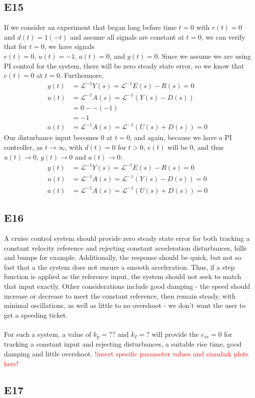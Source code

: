 \documentclass[11pt,titlepage]{article}
\begin{document}
	\subsection*{E15}
		If we consider an experiment that began long before time $t=0$ with $r(t)=0$ and $d(t)=1(-t)$ and assume all signals are constant at $t=0$, we can verify that for $t=0$, we have signals\\
		$e(t)=0$, $u(t)=-1$, $a(t)=0$, and $y(t)=0$.
	Since we assume we are using PI control for the system, there will be zero steady state error, so we know that $e(t)=0$ at $t=0$. Furthermore, 
	\begin{align*}
		y(t)&=\mathcal{L}^{-1}Y(s)=\mathcal{L}^{-1}E(s)-R(s)=0\\
		u(t)&=\mathcal{L}^{-1}A(s)=\mathcal{L}^{-1}(Y(s)-D(s))\\
		&=0--(-1)\\
		&=-1\\
		a(t)&=\mathcal{L}^{-1}A(s)=\mathcal{L}^{-1}(U(s)+D(s))=0
	\end{align*}
	Our disturbance input becomes 0 at $t=0$, and again, because we have a PI controller, as $t\to \infty$, with $d(t)=0$ for $t>0$, $e(t)$ will be 0, and thus $u(t)\to0$, $y(t)\to0$ and $a(t)\to0$:
	\begin{align*}
		y(t)&=\mathcal{L}^{-1}Y(s)=\mathcal{L}^{-1}E(s)-R(s)=0\\
		u(t)&=\mathcal{L}^{-1}A(s)=\mathcal{L}^{-1}(Y(s)-D(s))=0\\
		a(t)&=\mathcal{L}^{-1}A(s)=\mathcal{L}^{-1}(U(s)+D(s))=0
	\end{align*}
	
	\subsection*{E16}
		A cruise control system should provide zero steady state error for both tracking a constant velocity reference and rejecting constant acceleration disturbances, hills and bumps for example. Additionally, the response should be quick, but not so fast that a the system does not ensure a smooth acceleration. Thus, if a step function is applied as the reference input, the system should not seek to match that input exactly. Other considerations include good damping - the speed should increase or decrease to meet the constant reference, then remain steady, with minimal oscillations, as well as little to no overshoot - we don't want the user to get a speeding ticket.\\\\
		For such a system, a value of $k_p=??$ and $k_I=?$ will provide the $e_{ss}=0$ for tracking a constant input and rejecting disturbances, a suitable rise time, good damping and little overshoot. 
		\textcolor{red}{!insert specific parameter values and simulink plots here!}

	\subsection*{E17}
\end{document}
